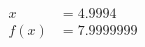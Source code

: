 \documentclass[preview]{standalone}
\begin{document}
\begin{align*}
x &= 4.9994\\f(x) &= 7.9999999
\end{align*}
\end{document}
